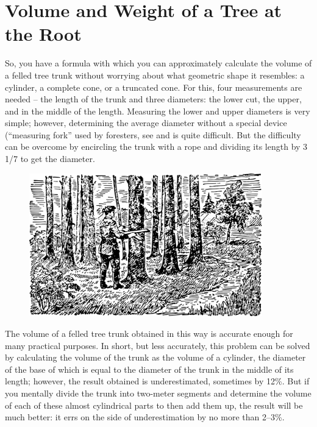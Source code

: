 \section{Volume and Weight of a Tree at the Root}
\label{sec-1.12}

So, you have a formula with which you can approximately calculate the volume of a felled tree trunk without worrying about what geometric shape it resembles: a cylinder, a complete cone, or a truncated cone. For this, four measurements are needed -- the length of the trunk and three diameters: the lower cut, the upper, and in the middle of the length. Measuring the lower and upper diameters is very simple; however, determining the average diameter without a special device (``measuring fork'' used by foresters, see  and  is quite difficult. But the difficulty can be overcome by encircling the trunk with a rope and dividing its length by 3 1/7 to get the diameter.

\begin{figure}[h!]
\centering
\includegraphics[width=0.9\textwidth]{figures/ch-01/fig-01-19.pdf}
\end{figure}


The volume of a felled tree trunk obtained in this way is accurate enough for many practical purposes. In short, but less accurately, this problem can be solved by calculating the volume of the trunk as the volume of a cylinder, the diameter of the base of which is equal to the diameter of the trunk in the middle of its length; however, the result obtained is underestimated, sometimes by 12\%. But if you mentally divide the trunk into two-meter segments and determine the volume of each of these almost cylindrical parts to then add them up, the result will be much better: it errs on the side of underestimation by no more than 2–3\%.

